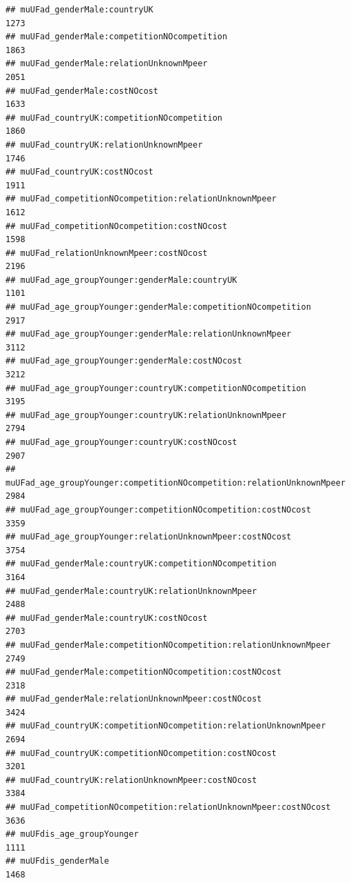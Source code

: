 \documentclass[
]{article}
\begin{document}
\begin{verbatim}
## muUFad_genderMale:countryUK                                                1273
## muUFad_genderMale:competitionNOcompetition                                 1863
## muUFad_genderMale:relationUnknownMpeer                                     2051
## muUFad_genderMale:costNOcost                                               1633
## muUFad_countryUK:competitionNOcompetition                                  1860
## muUFad_countryUK:relationUnknownMpeer                                      1746
## muUFad_countryUK:costNOcost                                                1911
## muUFad_competitionNOcompetition:relationUnknownMpeer                       1612
## muUFad_competitionNOcompetition:costNOcost                                 1598
## muUFad_relationUnknownMpeer:costNOcost                                     2196
## muUFad_age_groupYounger:genderMale:countryUK                               1101
## muUFad_age_groupYounger:genderMale:competitionNOcompetition                2917
## muUFad_age_groupYounger:genderMale:relationUnknownMpeer                    3112
## muUFad_age_groupYounger:genderMale:costNOcost                              3212
## muUFad_age_groupYounger:countryUK:competitionNOcompetition                 3195
## muUFad_age_groupYounger:countryUK:relationUnknownMpeer                     2794
## muUFad_age_groupYounger:countryUK:costNOcost                               2907
## muUFad_age_groupYounger:competitionNOcompetition:relationUnknownMpeer      2984
## muUFad_age_groupYounger:competitionNOcompetition:costNOcost                3359
## muUFad_age_groupYounger:relationUnknownMpeer:costNOcost                    3754
## muUFad_genderMale:countryUK:competitionNOcompetition                       3164
## muUFad_genderMale:countryUK:relationUnknownMpeer                           2488
## muUFad_genderMale:countryUK:costNOcost                                     2703
## muUFad_genderMale:competitionNOcompetition:relationUnknownMpeer            2749
## muUFad_genderMale:competitionNOcompetition:costNOcost                      2318
## muUFad_genderMale:relationUnknownMpeer:costNOcost                          3424
## muUFad_countryUK:competitionNOcompetition:relationUnknownMpeer             2694
## muUFad_countryUK:competitionNOcompetition:costNOcost                       3201
## muUFad_countryUK:relationUnknownMpeer:costNOcost                           3384
## muUFad_competitionNOcompetition:relationUnknownMpeer:costNOcost            3636
## muUFdis_age_groupYounger                                                   1111
## muUFdis_genderMale                                                         1468

\end{verbatim}
\end{document}
